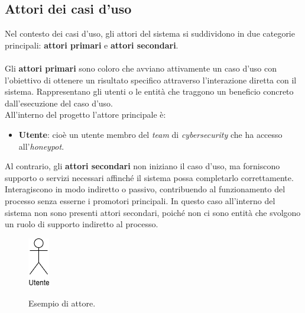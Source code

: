 \subsection*{Attori dei casi d'uso}
Nel contesto dei casi d'uso, gli attori del sistema si suddividono in due categorie principali: \textbf{attori primari} e \textbf{attori secondari}.\\\\
Gli \textbf{attori primari} sono coloro che avviano attivamente un caso d'uso con l'obiettivo di ottenere un risultato specifico attraverso l'interazione diretta con il sistema. Rappresentano gli utenti o le entità che traggono un beneficio concreto dall'esecuzione del caso d'uso.\\
All'interno del progetto l'attore principale è:
\begin{itemize}
    \item \textbf{Utente}: cioè un utente membro del \textit{team} di \textit{cybersecurity} che ha accesso all'\textit{honeypot}.
\end{itemize}
Al contrario, gli \textbf{attori secondari} non iniziano il caso d'uso, ma forniscono supporto o servizi necessari affinché il sistema possa completarlo correttamente. Interagiscono in modo indiretto o passivo, contribuendo al funzionamento del processo senza esserne i promotori principali. In questo caso all'interno del sistema non sono presenti attori secondari, poiché non ci sono entità che svolgono un ruolo di supporto indiretto al processo.\\
\begin{figure}[H]
    \begin{center}
        \includegraphics[alt={Esempio di attore}, width=0.075\columnwidth]{img/attore.png}
        \caption{Esempio di attore.}
        \label{fig:es-attore}
    \end{center}
\end{figure}

